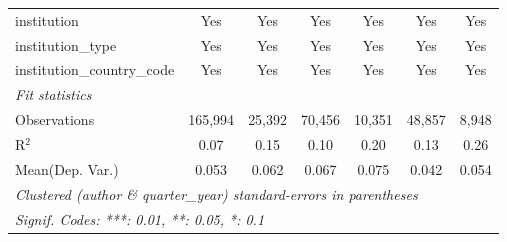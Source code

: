 \begin{tabular}{lcccccc}
   institution                  & Yes            & Yes           & Yes            & Yes           & Yes            & Yes\\  
   institution\_type            & Yes            & Yes           & Yes            & Yes           & Yes            & Yes\\  
   institution\_country\_code   & Yes            & Yes           & Yes            & Yes           & Yes            & Yes\\  
   \midrule
   \emph{Fit statistics}\\
   Observations                 & 165,994        & 25,392        & 70,456         & 10,351        & 48,857         & 8,948\\  
   R$^2$                        & 0.07           & 0.15          & 0.10           & 0.20          & 0.13           & 0.26\\  
Mean(Dep. Var.) & 0.053 & 0.062 & 0.067 & 0.075 & 0.042 & 0.054 \\
   \midrule \midrule
   \multicolumn{7}{l}{\emph{Clustered (author \& quarter\_year) standard-errors in parentheses}}\\
   \multicolumn{7}{l}{\emph{Signif. Codes: ***: 0.01, **: 0.05, *: 0.1}}\\
\end{tabular}
\par\endgroup
